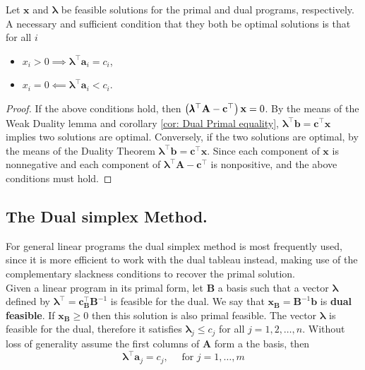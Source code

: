\begin{theorem}
Let $\mathbf{x}$ and $\pmb{\lambda}$ be feasible solutions for the primal and dual programs, respectively. A necessary and sufficient condition that they both be optimal solutions is that for all $i$
\begin{itemize}
	\item $x_i>0 \implies \pmb{\lambda}^\top \mathbf{a}_i=c_i$,
	\item $x_i=0 \impliedby \pmb{\lambda}^\top \mathbf{a}_i<c_i$. 
\end{itemize}

\end{theorem}

\begin{proof}
If the above conditions hold, then $\left( \pmb{\lambda}^\top \mathbf{A}-\mathbf{c}^\top \right)\mathbf{x}=0$. By the means of the Weak Duality lemma and corollary \ref{cor: Dual Primal equality}, $\pmb{\lambda}^\top\mathbf b =\mathbf c ^ \top\mathbf x$ implies two solutions are optimal. Conversely, if the two solutions are optimal, by the means of the Duality Theorem $\pmb{\lambda}^\top \mathbf{b}= \mathbf{c}^\top \mathbf{x}$. Since each component of $\mathbf{x}$ is nonnegative and each component of  $\pmb{\lambda}^\top\mathbf{A}-\mathbf{c}^\top$ is nonpositive, and the above conditions must hold.
\end{proof}

\subsection{The Dual simplex Method.}
For general linear programs the dual simplex method is most frequently used, since it is more efficient to work with the dual tableau instead, making use of the complementary slackness conditions to recover the primal solution.\\

Given a linear program in its primal form, let $\mathbf{B}$ a basis such that a vector $\pmb{\lambda}$  defined by $\pmb\lambda^\top=\mathbf{c}_{\mathbf{B}}^\top\mathbf{B}^{-1}$ is feasible for the dual. We say that $\mathbf{x}_{\mathbf{B}}=\mathbf{B}^{-1}\mathbf{b}$ is \textbf{dual feasible}. If $\mathbf{x}_\mathbf{B}\geq 0$ then this solution is also primal feasible.  
The vector $\pmb\lambda$ is feasible for the dual, therefore it satisfies $\pmb\lambda_j\leq c_j$ for all $j=1, 2, \dots, n$. Without loss of generality assume the first columns of $\mathbf{A}$ form a the basis, then
\begin{equation}
	\pmb{\lambda}^\top \mathbf{a}_j = c_j, \quad \text{ for } j=1, \dots, m
\end{equation}

